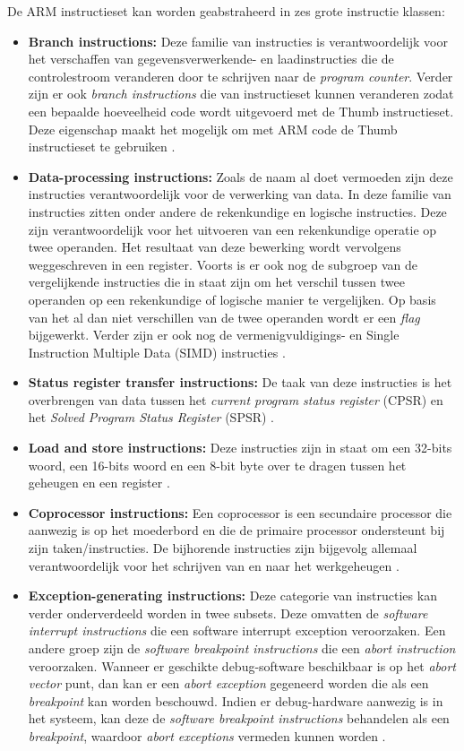 De ARM instructieset kan worden geabstraheerd in zes grote instructie klassen:
\begin{itemize}
    \item \textbf{Branch instructions:} Deze familie van instructies is verantwoordelijk voor het verschaffen van gegevensverwerkende- en laadinstructies die de controlestroom veranderen door te schrijven naar de \textit{program counter}. Verder zijn er ook \textit{branch instructions} die van instructieset kunnen veranderen zodat een bepaalde hoeveelheid code wordt uitgevoerd met de Thumb instructieset. Deze eigenschap maakt het mogelijk om met ARM code de Thumb instructieset te gebruiken \autocite{Seal2000}.
    \item \textbf{Data-processing instructions:} Zoals de naam al doet vermoeden zijn deze instructies verantwoordelijk voor de verwerking van data. In deze familie van instructies zitten onder andere de rekenkundige en logische instructies. Deze zijn verantwoordelijk voor het uitvoeren van een rekenkundige operatie op twee operanden. Het resultaat van deze bewerking wordt vervolgens weggeschreven in een register. Voorts is er ook nog de subgroep van de vergelijkende instructies die in staat zijn om het verschil tussen twee operanden op een rekenkundige of logische manier te vergelijken. Op basis van het al dan niet verschillen van de twee operanden wordt er een \textit{flag} bijgewerkt. Verder zijn er ook nog de vermenigvuldigings- en Single Instruction Multiple Data (SIMD) instructies \autocite{Seal2000}.
    \item \textbf{Status register transfer instructions:} De taak van deze instructies is het overbrengen van data tussen het \textit{current program status register} (CPSR) en het \textit{Solved Program Status Register} (SPSR) \autocite{ARM2022c}.
    \item \textbf{Load and store instructions:} Deze instructies zijn in staat om een 32-bits woord, een 16-bits woord en een 8-bit byte over te dragen tussen het geheugen en een register \autocite{ARM2022c}.
    \item \textbf{Coprocessor instructions:} Een coprocessor is een secundaire processor die aanwezig is op het moederbord en die de primaire processor ondersteunt bij zijn taken/instructies. De bijhorende instructies zijn bijgevolg allemaal verantwoordelijk voor het schrijven van en naar het werkgeheugen \autocite{ARM2022c}.
    \item \textbf{Exception-generating instructions:} Deze categorie van instructies kan verder onderverdeeld worden in twee subsets. Deze omvatten de \textit{software interrupt instructions} die een software interrupt exception veroorzaken. Een andere groep zijn de \textit{software breakpoint instructions} die een \textit{abort instruction} veroorzaken. Wanneer er geschikte debug-software beschikbaar is op het \textit{abort vector} punt, dan kan er een \textit{abort exception} gegeneerd worden die als een \textit{breakpoint} kan worden beschouwd. Indien er debug-hardware aanwezig is in het systeem, kan deze de \textit{software breakpoint instructions} behandelen als een \textit{breakpoint}, waardoor \textit{abort exceptions} vermeden kunnen worden \autocite{Seal2000}.
\end{itemize}

